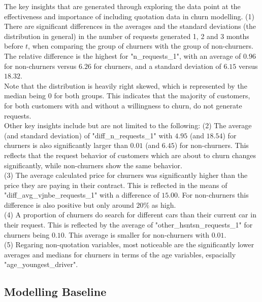 \documentclass[12pt,titlepage]{article}
\begin{document}
\noindent
The key insights that are generated through exploring the data point at the effectiveness and importance of including quotation data in churn modelling. (1) There are significant differences in the averages and the standard deviations (the distribution in general) in the number of requests generated 1, 2 and 3 months before $t$, when comparing the group of churners with the group of non-churners. The relative difference is the highest for "n\_requests\_1", with an average of $0.96$ for non-churners versus $6.26$ for churners, and a standard deviation of $6.15$ versus $18.32$. \\
Note that the distribution is heavily right skewed, which is represented by the median being $0$ for both groups. This indicates that the majority of customers, for both customers with and without a willingness to churn, do not generate requests. \\
Other key insights include but are not limited to the following: (2) The average (and standard deviation) of "diff\_n\_requests\_1" with $4.95$ (and $18.54$) for churners is also significantly larger than $0.01$ (and $6.45$) for non-churners. This reflects that the request behavior of customers which are about to churn changes significantly, while non-churners show the same behavior. \\
(3) The average calculated price for churners was significantly higher than the price they are paying in their contract. This is reflected in the means of "diff\_avg\_vjnbe\_requests\_1" with a difference of $15.00$. For non-churners this difference is also positive but only around $20\%$ as high. \\
(4) A proportion of churners do search for different cars than their current car in their request. This is reflected by the average of "other\_hsntsn\_requests\_1" for churners being $0.10$. This average is smaller for non-churners with $0.01$. \\
(5) Regaring non-quotation variables, most noticeable are the significantly lower averages and medians for churners in terms of the age variables, espacially "age\_youngest\_driver". \\

\subsection{Modelling Baseline} \par
\end{document}
